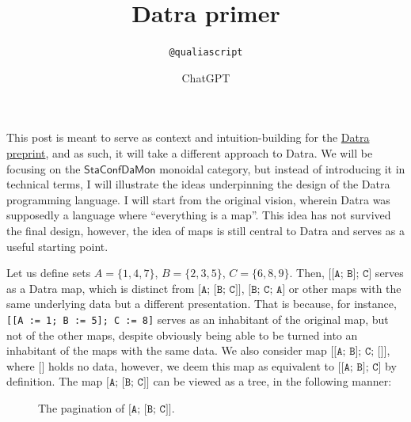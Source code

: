 \documentclass[11pt]{article}
\title{Datra primer}
\author{\texttt{@qualiascript} \and ChatGPT}
\date{}
\newcommand{\code}[1]{\texttt{#1}}
\newcommand{\StaConfDaMon}{\mathsf{StaConfDaMon}}
\begin{document}
\maketitle

This post is meant to serve as context and intuition-building for the
\href{run:preprint.pdf}{Datra preprint}, and as such, it will take a
different approach to Datra. We will be focusing on the
\(\StaConfDaMon\) monoidal category, but instead of introducing it in
technical terms, I will illustrate the ideas underpinning the design of the
Datra programming language. I will start from the original vision, wherein
Datra was supposedly a language where ``everything is a map''. This idea has
not survived the final design, however, the idea of maps is still central to
Datra and serves as a useful starting point.

Let us define sets \(A = \{1, 4, 7\}\), \(B = \{2, 3, 5\}\),
\(C = \{6, 8, 9\}\). Then, \(\code{[[A; B]; C]}\) serves as a Datra map,
which is distinct from \(\code{[A; [B; C]]}\), \(\code{[B; C; A]}\) or
other maps with the same underlying data but a different presentation. That
    is because, for instance,
    \code{[[A := 1;\allowbreak\ B := 5];\allowbreak\ C := 8]} serves as
an inhabitant of the original map, but not of the other maps, despite
obviously being able to be turned into an inhabitant of the maps with the
same data. We also consider map \(\code{[[A; B]; C; []]}\), where
\(\code{[]}\) holds no data, however, we deem this map as equivalent to
\(\code{[[A; B]; C]}\) by definition. The map \(\code{[A; [B; C]]}\) can
be viewed as a tree, in the following manner:

\begin{figure}[htbp]
\centering
{}
\caption{The pagination of \(\code{[A; [B; C]]}\).}
\label{fig:pagination}
\end{figure}
\end{document}
